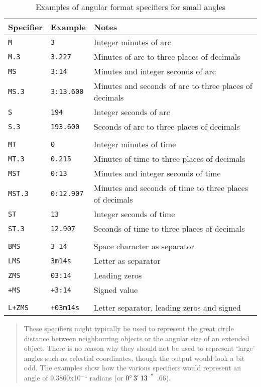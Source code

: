 \documentclass[twoside,11pt]{article}
\newcommand{\arcsec} {$\hspace{-0.05em}\raisebox{-0.5ex}
                     {$^{'\hspace{-0.1em}'}$}
                     \hspace{-0.7em}.\hspace{-0.05em}$}
\newcommand{\dms}[4] {$#1^{\circ}\,#2\raisebox{-0.5ex}{$^{'}$}\,#3\arcsec#4$}
\renewcommand{\_}{\texttt{\symbol{95}}}
\begin{document}
\begin{table}[htbp]

\begin{center}
\begin{tabular}{lll}
Specifier   & Example        & Notes          \\ \hline
{\tt M}     & {\tt 3}        & Integer minutes of arc \\
{\tt M.3}   & {\tt 3.227}    & Minutes of arc to three places of decimals \\
{\tt MS}    & {\tt 3:14}     & Minutes and integer seconds of arc \\
{\tt MS.3}  & {\tt 3:13.600} & Minutes and seconds of arc to three places of decimals \\
{\tt S}     & {\tt 194}      & Integer seconds of arc \\
{\tt S.3}   & {\tt 193.600}  & Seconds of arc to three places of decimals \\
            &                & \\
{\tt MT}    & {\tt 0}        & Integer minutes of time \\
{\tt MT.3}  & {\tt 0.215}    & Minutes of time to three places of decimals \\
{\tt MST}   & {\tt 0:13}     & Minutes and integer seconds of time\\
{\tt MST.3} & {\tt 0:12.907} & Minutes and seconds of time to three places of decimals \\
{\tt ST}    & {\tt 13}       & Integer seconds of time \\
{\tt ST.3}  & {\tt 12.907}   & Seconds of time to three places of decimals \\
            &                & \\
{\tt BMS}   & {\tt 3 14}     & Space character as separator \\
{\tt LMS}   & {\tt 3m14s}    & Letter as separator \\
{\tt ZMS}   & {\tt 03:14}    & Leading zeros \\
{\tt +MS}   & {\tt +3:14}    & Signed value \\
            &                & \\
{\tt L+ZMS} & {\tt +03m14s}  & Letter separator, leading zeros and signed \\
\end{tabular}

\begin{quote}
These specifiers might typically be used to represent the great circle
distance between neighbouring objects or the angular size of an extended
object.  There is no reason why they should not be used to represent
`large' angles such as celestial coordinates, though the output would
look a bit odd.  The examples show how the various specifiers would
represent an angle of 9.3860x10$^{-4}$ radians (or \dms{0}{3}{13}{66}).
\end{quote}

\caption{\label{SMALL_EXAM}Examples of angular format specifiers for
small angles}
\end{center}

\end{table}
\end{document}
